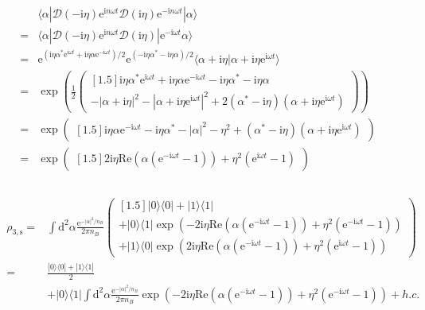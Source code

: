 \documentclass[10pt,fleqn]{article}
\newcommand{\ud}{\mathrm{d}}
\newcommand{\ue}{\mathrm{e}}
\newcommand{\ui}{\mathrm{i}}
\newcommand{\eqar}[1]
{
  \begin{align}
    #1
  \end{align}
}
\newcommand{\paren}[1]{{\left({#1}\right)}}
\newcommand{\abs}[1]{{\left|{#1}\right|}}
\begin{document}
\eqar{
  \begin{split}
    &\langle\alpha|\mathcal{D}(-\ui\eta)\ue^{\ui n\omega t}
      \mathcal{D}(\ui\eta)\ue^{-\ui n\omega t}|\alpha\rangle\\
    =&\langle\alpha|\mathcal{D}(-\ui\eta)\ue^{\ui n\omega t}
       \mathcal{D}(\ui\eta)|\ue^{-\ui\omega t}\alpha\rangle\\
    =&\ue^{(\ui\eta\alpha^*\ue^{\ui\omega t}+\ui\eta\alpha\ue^{-\ui\omega t})/2}
       \ue^{(-\ui\eta\alpha^*-\ui\eta\alpha)/2}
       \langle\alpha+\ui\eta|\alpha+\ui\eta\ue^{\ui\omega t}\rangle\\
    =&\exp\paren{\frac12
       \begin{pmatrix}[1.5]
         \ui\eta\alpha^*\ue^{\ui\omega t}+\ui\eta\alpha\ue^{-\ui\omega t}
         -\ui\eta\alpha^*-\ui\eta\alpha\\
         -\abs{\alpha+\ui\eta}^2-\abs{\alpha+\ui\eta\ue^{\ui\omega t}}^2
         +2\paren{\alpha^*-\ui\eta}\paren{\alpha+\ui\eta\ue^{\ui\omega t}}
       \end{pmatrix}
       }\\
    =&\exp\begin{pmatrix}[1.5]
      \ui\eta\alpha\ue^{-\ui\omega t}-\ui\eta\alpha^*-\abs{\alpha}^2-\eta^2+\paren{\alpha^*-\ui\eta}\paren{\alpha+\ui\eta\ue^{\ui\omega t}}
    \end{pmatrix}\\
    =&\exp\begin{pmatrix}[1.5]
      2\ui\eta\mathrm{Re}\paren{\alpha\paren{\ue^{-\ui\omega t}-1}}
      +\eta^2\paren{\ue^{\ui\omega t}-1}
    \end{pmatrix}\\
  \end{split}
}
\eqar{
  \begin{split}
    \rho_{3,\mathrm{s}}
    =&\int\ud^2\alpha \frac{\ue^{-\abs{\alpha}^2/n_B}}{2\pi n_B}
       \begin{pmatrix}[1.5]
         |0\rangle\langle0|
         +|1\rangle\langle1|\\
         +|0\rangle\langle1|
         \exp\paren{
         -2\ui\eta\mathrm{Re}\paren{\alpha\paren{\ue^{-\ui\omega t}-1}}
         +\eta^2\paren{\ue^{-\ui\omega t}-1}}\\
         +|1\rangle\langle0|
         \exp\paren{
         2\ui\eta\mathrm{Re}\paren{\alpha\paren{\ue^{-\ui\omega t}-1}}
         +\eta^2\paren{\ue^{\ui\omega t}-1}}
       \end{pmatrix}\\
    =&\frac{|0\rangle\langle0|+|1\rangle\langle1|}{2}\\
    &+|0\rangle\langle1|\int\ud^2\alpha \frac{\ue^{-\abs{\alpha}^2/n_B}}{2\pi n_B}
      \exp\paren{
      -2\ui\eta\mathrm{Re}\paren{\alpha\paren{\ue^{-\ui\omega t}-1}}
      +\eta^2\paren{\ue^{-\ui\omega t}-1}}+h.c.
  \end{split}
}
\end{document}
